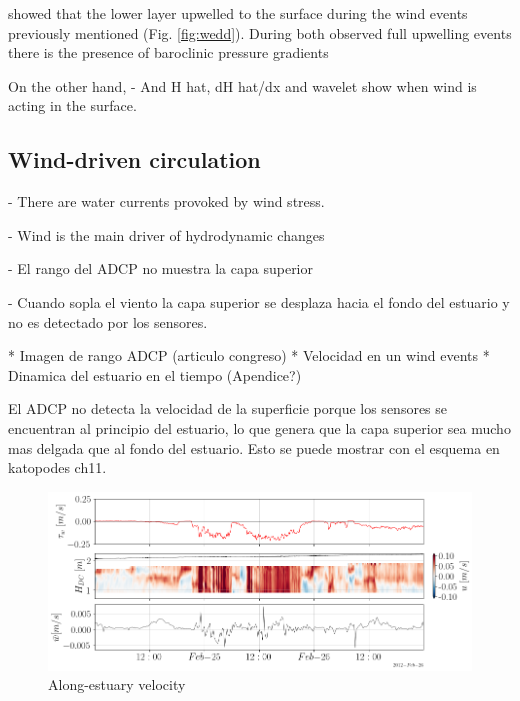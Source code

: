 \documentclass[tesis.tex]{subfiles}
\begin{document}
showed that the lower layer upwelled to the surface during the wind events previously mentioned (Fig. \ref{fig:wedd}). During both observed full upwelling events there is the presence of baroclinic pressure gradients

On the other hand, 
- And H hat, dH hat/dx and wavelet show when wind is acting in the surface.
 
\subsection{Wind-driven circulation}

- There are water currents provoked by wind stress.

- Wind is the main driver of hydrodynamic changes

- El rango del ADCP no muestra la capa superior

- Cuando sopla el viento la capa superior se desplaza hacia el fondo del estuario y no es detectado por los sensores.

* Imagen de rango ADCP (articulo congreso)
* Velocidad en un wind events
* Dinamica del estuario en el tiempo (Apendice?)

El ADCP no detecta la velocidad de la superficie porque los sensores se encuentran al principio del estuario, lo que genera que la capa superior sea mucho mas delgada que al fondo del estuario.
Esto se puede mostrar con el esquema en katopodes ch11.




\begin{figure}[h!]
    \centering
    \includegraphics[width=\textwidth]{Imagenes/vel_wind.png}
    \caption{Along-estuary velocity }
    \label{fig:velwind}
\end{figure}
\end{document}
